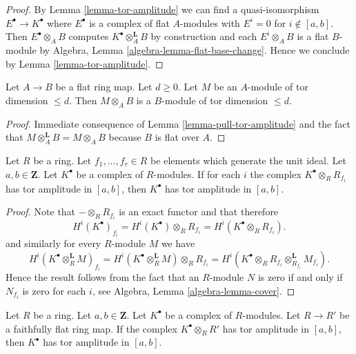 \begin{proof}
By
Lemma \ref{lemma-tor-amplitude}
we can find a quasi-isomorphism $E^\bullet \to K^\bullet$ where
$E^\bullet$ is a complex of flat $A$-modules with $E^i = 0$ for
$i \not \in [a, b]$. Then $E^\bullet \otimes_A B$ computes
$K^\bullet \otimes_A ^{\mathbf{L}} B$ by construction and
each $E^i \otimes_A B$ is a flat $B$-module by
Algebra, Lemma \ref{algebra-lemma-flat-base-change}.
Hence we conclude by
Lemma \ref{lemma-tor-amplitude}.
\end{proof}

\begin{lemma}
\label{lemma-flat-base-change-finite-tor-dimension}
Let $A \to B$ be a flat ring map. Let $d \geq 0$.
Let $M$ be an $A$-module of tor dimension $\leq d$.
Then $M \otimes_A B$ is a $B$-module of tor dimension $\leq d$.
\end{lemma}

\begin{proof}
Immediate consequence of
Lemma \ref{lemma-pull-tor-amplitude}
and the fact that $M \otimes_A^{\mathbf{L}} B = M \otimes_A B$
because $B$ is flat over $A$.
\end{proof}

\begin{lemma}
\label{lemma-glue-tor-amplitude}
Let $R$ be a ring. Let $f_1, \ldots, f_r \in R$ be elements which
generate the unit ideal. Let $a, b \in \mathbf{Z}$. Let $K^\bullet$
be a complex of $R$-modules. If for each $i$ the complex
$K^\bullet \otimes_R R_{f_i}$ has tor amplitude in $[a, b]$,
then $K^\bullet$ has tor amplitude in $[a, b]$.
\end{lemma}

\begin{proof}
Note that $- \otimes_R R_{f_i}$ is an exact functor and that therefore
$$
H^i(K^\bullet)_{f_i} =
H^i(K^\bullet) \otimes_R R_{f_i} = H^i(K^\bullet \otimes_R R_{f_i}).
$$
and similarly for every $R$-module $M$ we have
$$
H^i(K^\bullet \otimes_R^{\mathbf{L}} M)_{f_i} =
H^i(K^\bullet \otimes_R^{\mathbf{L}} M) \otimes_R R_{f_i} =
H^i(K^\bullet \otimes_R R_{f_i} \otimes_{R_{f_i}}^{\mathbf{L}} M_{f_i}).
$$
Hence the result follows from the fact that an $R$-module $N$
is zero if and only if $N_{f_i}$ is zero for each $i$, see
Algebra, Lemma \ref{algebra-lemma-cover}.
\end{proof}

\begin{lemma}
\label{lemma-flat-descent-tor-amplitude}
Let $R$ be a ring. Let $a, b \in \mathbf{Z}$. Let $K^\bullet$
be a complex of $R$-modules. Let $R \to R'$ be a faithfully flat
ring map. If the complex $K^\bullet \otimes_R R'$ has tor amplitude
in $[a, b]$, then $K^\bullet$ has tor amplitude in $[a, b]$.
\end{lemma}


